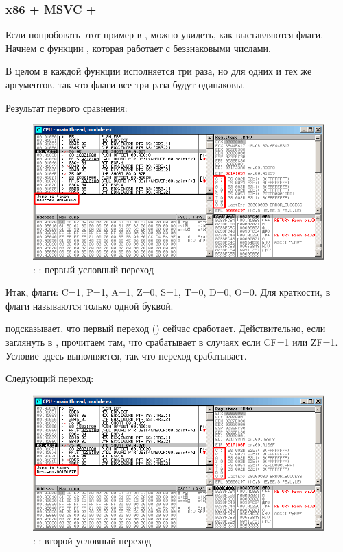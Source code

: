 \clearpage
\subsubsection{x86 + MSVC + \olly}
\myindex{\olly}

Если попробовать этот пример в \olly, можно увидеть, как выставляются флаги.
Начнем с функции , которая работает с беззнаковыми числами.

В целом в каждой функции \CMP исполняется три раза, но для одних и тех же аргументов, 
так что флаги все три раза будут одинаковы.

Результат первого сравнения:

\begin{figure}[H]
\centering
\includegraphics[scale=\FigScale]{patterns/07_jcc/simple/olly_unsigned1.png}
\caption{\olly: : первый условный переход}
\label{fig:jcc_olly_unsigned_1}
\end{figure}

Итак, флаги: C=1, P=1, A=1, Z=0, S=1, T=0, D=0, O=0.
Для краткости, в \olly флаги называются только одной буквой.

\olly подсказывает, что первый переход (\JBE) сейчас сработает.  Действительно, если заглянуть в \cite{Intel}, 
прочитаем там, что \JBE срабатывает в случаях если CF=1 или ZF=1.
Условие здесь выполняется, так что переход срабатывает.

\clearpage
Следующий переход:

\begin{figure}[H]
\centering
\includegraphics[scale=\FigScale]{patterns/07_jcc/simple/olly_unsigned2.png}
\caption{\olly: : второй условный переход}
\label{fig:jcc_olly_unsigned_2}
\end{figure}

